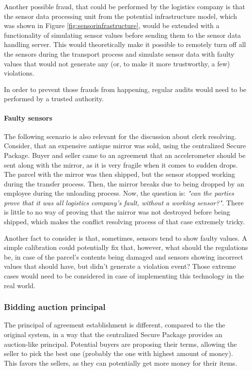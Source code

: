 Another possible fraud, that could be performed by the logistics company is that the sensor data processing unit from the potential infrastructure model, which was shown in Figure \ref{fig:sensorinfrastructure}, would be extended with a functionality of simulating sensor values before sending them to the sensor data handling server. This would theoretically make it possible to remotely turn off all the sensors during the transport process and simulate sensor data with faulty values that would not generate any (or, to make it more trustworthy, a few) violations.

In order to prevent those frauds from happening, regular audits would need to be performed by a trusted authority.

\paragraph{Faulty sensors}
The following scenario is also relevant for the discussion about clerk resolving. Consider, that an expensive antique mirror was sold, using the centralized Secure Package. Buyer and seller came to an agreement that an accelerometer should be sent along with the mirror, as it is very fragile when it comes to sudden drops. The parcel with the mirror was then shipped, but the sensor stopped working during the transfer process. Then, the mirror breaks due to being dropped by an employee during the unloading process. Now, the question is: \textit{"can the parties prove that it was all logistics company's fault, without a working sensor?"}. There is little to no way of proving that the mirror was not destroyed before being shipped, which makes the conflict resolving process of that case extremely tricky.

Another fact to consider is that, sometimes, sensors tend to show faulty values. A simple calibration could potentially fix that, however, what should the regulations be, in case of the parcel's contents being damaged and sensors showing incorrect values that should have, but didn't generate a violation event? Those extreme cases would need to be considered in case of implementing this technology in the real world.

\subsubsection{Bidding auction principal}
The principal of agreement establishment is different, compared to the the original system, in a way that the centralized Secure Package provides an auction-like principal. Potential buyers are proposing their terms, allowing the seller to pick the best one (probably the one with highest amount of money). This favors the sellers, as they can potentially get more money for their items.

